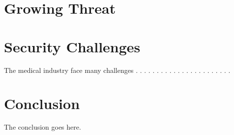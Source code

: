 \documentclass{IEEEtran}
\begin{document}
\section{Growing Threat}

\section{Security Challenges}

The medical industry face many challenges \cite{Sametinger}.
\cite{coventry2018cybersecurity}.
\cite{williams2015cybersecurity}.
\cite{moses2015lack}.
\cite{ferrara2019cybersecurity}.
\cite{murphy2015cybersecurity}.
\cite{stites2016secure}.
\cite{InformationSecurityonDiagnosticImagingSystem}.
\cite{Ray}.
\cite{gerard2013cybersecurity}.
\cite{mahler2018know}.
\cite{ma2019medical}.
\cite{busdicker2017role}.
\cite{martin2017cybersecurity}.
\cite{Marwan}.
\cite{FooKune:2012:TSI:2342536.2342540}.
\cite{Almohri:2017:TMM:3204094.3204113}.
\cite{tk2013inside}.
\cite{fu2014controlling}.
\cite{tanev2015value}.
\cite{Sametinger:2015:SCM:2749359.2667218}.
\cite{tanev2015value}.
\cite{CyberSecurity}.


\section{Conclusion}
The conclusion goes here.





\end{document}
